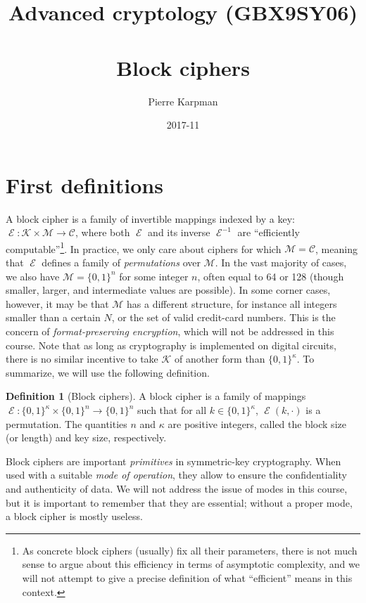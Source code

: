 \documentclass[11pt,a4paper]{article}
\title{Advanced cryptology (GBX9SY06)\\
\decosix\\
Block ciphers}
\date{2017-11}
\author{Pierre Karpman}
\theoremstyle{definition}
\newtheorem{defi}{Definition}
\DeclareMathOperator\E{\mathcal{E}}
\newcommand\ks{\mathcal{K}}
\newcommand\ms{\mathcal{M}}
\newcommand\cs{\mathcal{C}}
\newcommand\msb{\{0,1\}^n}
\newcommand\ksb{\{0,1\}^\kappa}
\begin{document}
\maketitle{}

\section{First definitions}

A block cipher is a family of invertible mappings indexed by a key: $\E : \ks \times \ms \rightarrow \cs$, where both $\E$ and its inverse
$\E^{-1}$ are ``efficiently computable''\footnote{As concrete block ciphers (usually) fix all their parameters, there is not much sense to argue about this
efficiency in terms of asymptotic complexity, and we will not attempt to give a precise definition of what ``efficient'' means in this context.}.
In practice, we only care about ciphers for which $\ms = \cs$, meaning that $\E$ defines a family
of \emph{permutations} over $\ms$. In the vast majority of cases, we also have $\ms = \{0,1\}^n$ for some integer $n$, often equal
to 64 or 128 (though smaller, larger, and intermediate values are possible). In some corner cases, however, it may be that $\ms$
has a different structure, for instance all integers smaller than a certain $N$, or the set of valid credit-card numbers. This is the
concern of \emph{format-preserving encryption}, which will not be addressed in this course. Note that as long as cryptography
is implemented on digital circuits, there is no similar incentive to take $\ks$ of another form than $\{0,1\}^\kappa$. To summarize,
we will use the following definition.

\begin{defi}[Block ciphers]
\label{def:bc}
A block cipher is a family of mappings $\E : \ksb \times \msb \rightarrow \msb$ such that for all $k \in \ksb$, $\E(k,\cdot)$ is a permutation.
The quantities $n$ and $\kappa$ are positive integers, called the block size (or length) and key size, respectively.
\end{defi}

Block ciphers are important \emph{primitives} in symmetric-key cryptography. When used with a suitable \emph{mode of operation},
they allow to ensure the confidentiality and authenticity of data. We will not address the issue of modes in this course, but it
is important to remember that they are essential; without a proper mode, a block cipher is mostly useless.
\end{document}
